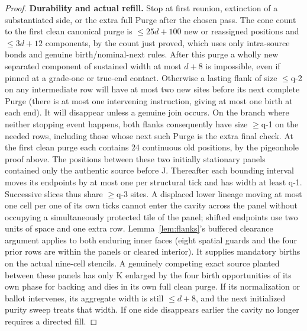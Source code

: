 \begin{proof}
\textbf{Durability and actual refill.} Stop at first reunion, extinction of a substantiated side, or the extra full Purge after the chosen pass. The cone count to the first clean canonical purge is \(\le\)\(25d+100\) new or reassigned positions and \(\le\)\(3d+12\) components, by the count just proved, which uses only intra-source bonds and genuine birth/nominal-next rules. After this purge a wholly new separated component of sustained width at most \(d+8\) is impossible, even if pinned at a grade-one or true-end contact. Otherwise a lasting flank of size \(\le\)q-2 on any intermediate row will have at most two new sites before its next complete Purge (there is at most one intervening instruction, giving at most one birth at each end). It will disappear unless a genuine join occurs. On the branch where neither stopping event happens, both flanks consequently have size \(\ge\)q-1 on the needed rows, including those whose next such Purge is the extra final check. At the first clean purge each contains 24 continuous old positions, by the pigeonhole proof above. The positions between these two initially stationary panels contained only the authentic source before J. Thereafter each bounding interval moves its endpoints by at most one per structural tick and has width at least q-1. Successive slices thus share \(\ge\)q-3 sites. A displaced lower lineage moving at most one cell per one of its own ticks cannot enter the cavity across the panel without occupying a simultaneously protected tile of the panel; shifted endpoints use two units of space and one extra row. Lemma~\ref{lem:flanks}'s buffered clearance argument applies to both enduring inner faces (eight spatial guards and the four prior rows are within the panels or cleared interior). It supplies mandatory births on the actual nine-cell stencils. A genuinely competing exact source planted between these panels has only K enlarged by the four birth opportunities of its own phase for backing and dies in its own full clean purge. If its normalization or ballot intervenes, its aggregate width is still \(\le\)\(d+8\), and the next initialized purity sweep treats that width. If one side disappears earlier the cavity no longer requires a directed fill.


\end{proof}

